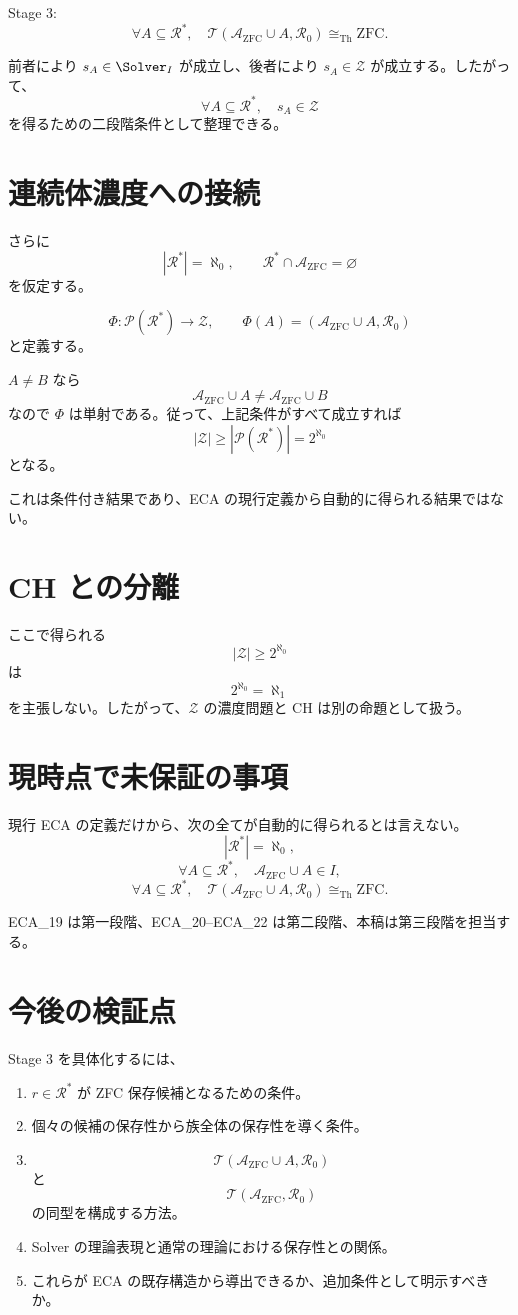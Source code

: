 \documentclass[a4paper,11pt]{ltjsarticle}
\begin{document}
Stage 3:
\[
\forall A\subseteq\mathcal{R}^*,
\quad
\mathcal{T}(\mathcal{A}_{\mathrm{ZFC}}\cup A,\mathcal{R}_0)
\cong_{\mathrm{Th}}\mathrm{ZFC}.
\]

前者により \(s_A\in\Solver_I\) が成立し、後者により \(s_A\in\mathcal{Z}\) が成立する。したがって、
\[
\boxed{\forall A\subseteq\mathcal{R}^*,\quad s_A\in\mathcal{Z}}
\]
を得るための二段階条件として整理できる。

\section{連続体濃度への接続}
さらに
\[
|\mathcal{R}^*|=\aleph_0,
\qquad
\mathcal{R}^*\cap\mathcal{A}_{\mathrm{ZFC}}=\varnothing
\]
を仮定する。

\[
\Phi:\mathcal{P}(\mathcal{R}^*)\to\mathcal{Z},
\qquad
\Phi(A)=
(\mathcal{A}_{\mathrm{ZFC}}\cup A,\mathcal{R}_0)
\]
と定義する。

\(A\neq B\) なら
\[
\mathcal{A}_{\mathrm{ZFC}}\cup A
\neq
\mathcal{A}_{\mathrm{ZFC}}\cup B
\]
なので \(\Phi\) は単射である。従って、上記条件がすべて成立すれば
\[
\boxed{
|\mathcal{Z}|
\ge
|\mathcal{P}(\mathcal{R}^*)|
=
2^{\aleph_0}
}
\]
となる。

これは条件付き結果であり、ECA の現行定義から自動的に得られる結果ではない。

\section{CH との分離}
ここで得られる
\[
|\mathcal{Z}|\ge2^{\aleph_0}
\]
は
\[
2^{\aleph_0}=\aleph_1
\]
を主張しない。したがって、\(\mathcal{Z}\) の濃度問題と CH は別の命題として扱う。

\section{現時点で未保証の事項}
現行 ECA の定義だけから、次の全てが自動的に得られるとは言えない。
\[
|\mathcal{R}^*|=\aleph_0,
\]
\[
\forall A\subseteq\mathcal{R}^*,
\quad
\mathcal{A}_{\mathrm{ZFC}}\cup A\in I,
\]
\[
\forall A\subseteq\mathcal{R}^*,
\quad
\mathcal{T}(\mathcal{A}_{\mathrm{ZFC}}\cup A,\mathcal{R}_0)
\cong_{\mathrm{Th}}\mathrm{ZFC}.
\]

ECA_19 は第一段階、ECA_20--ECA_22 は第二段階、本稿は第三段階を担当する。

\section{今後の検証点}
Stage 3 を具体化するには、
\begin{enumerate}
\item \(r\in\mathcal{R}^*\) が ZFC 保存候補となるための条件。
\item 個々の候補の保存性から族全体の保存性を導く条件。
\item
\[
\mathcal{T}(\mathcal{A}_{\mathrm{ZFC}}\cup A,\mathcal{R}_0)
\]
と
\[
\mathcal{T}(\mathcal{A}_{\mathrm{ZFC}},\mathcal{R}_0)
\]
の同型を構成する方法。
\item Solver の理論表現と通常の理論における保存性との関係。
\item これらが ECA の既存構造から導出できるか、追加条件として明示すべきか。
\end{enumerate}
\end{document}
